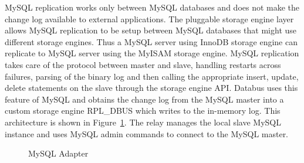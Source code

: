MySQL replication works only between MySQL databases and does not make the change log available to external applications. The pluggable storage engine layer allows MySQL replication to be setup between MySQL databases that might use different storage engines. 
Thus a MySQL server using InnoDB storage engine can replicate to MySQL server using the MyISAM storage engine. MySQL replication takes care of the protocol between master and slave, handling restarts across failures, parsing of the binary log and then calling the appropriate insert, update, delete statements on the slave through the storage engine API. Databus uses this feature of MySQL and obtains the change log from the MySQL master into a custom storage engine RPL\_DBUS which writes to the in-memory log. This architecture is shown in Figure~\ref{fig:mysql-adapter}. The relay manages the local slave MySQL instance and uses MySQL admin commands to connect to the MySQL master.

\begin{figure}
\centering
{}
\caption{MySQL Adapter}
\label{fig:mysql-adapter}
\end{figure}

